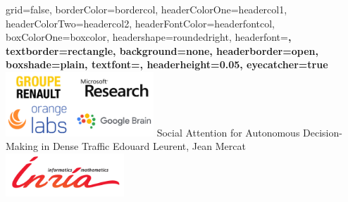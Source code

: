 \documentclass[a0paper,portrait,fontscale=0.3, margin=2cm]{baposter}
\begin{document}
\begin{poster}{
grid=false,
borderColor=bordercol, %
headerColorOne=headercol1, %
headerColorTwo=headercol2, %
headerFontColor=headerfontcol, %
boxColorOne=boxcolor, %
headershape=roundedright, %
headerfont=\Large\bf\textsc, %
textborder=rectangle,
background=none,
headerborder=open, %
boxshade=plain,
textfont={\setlength{\parindent}{0.0em}\sffamily},
headerheight={0.05\textheight},
eyecatcher=true
}
%
%
{
\includegraphics[width=15em]{./img/companies}
}
{
Social Attention for Autonomous Decision-Making in Dense Traffic
}
{
Edouard Leurent, Jean Mercat
\vspace{-2\baselineskip}
}
{
\includegraphics[width=12em]{./img/inria_sc}
}

\setlength{\colheight}{0.92\textheight}


\end{poster}
\end{document}
